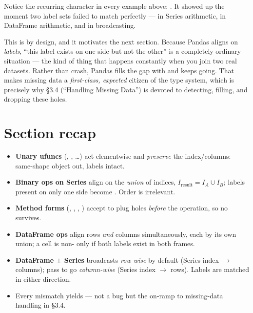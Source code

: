 \documentclass[11pt]{article}
\begin{document}
Notice the recurring character in every example above: . It showed up the moment two label sets failed to match perfectly --- in Series arithmetic, in DataFrame arithmetic, and in broadcasting.

\begin{keyidea}
This is by design, and it motivates the next section. Because Pandas aligns on \emph{labels}, ``this label exists on one side but not the other'' is a completely ordinary situation --- the kind of thing that happens constantly when you join two real datasets. Rather than crash, Pandas fills the gap with  and keeps going. That makes missing data a \emph{first-class, expected} citizen of the type system, which is precisely why \S3.4 (``Handling Missing Data'') is devoted to detecting, filling, and dropping these holes.
\end{keyidea}

\section*{Section recap}
\begin{itemize}
  \item \textbf{Unary ufuncs} (, , \dots) act elementwise and \emph{preserve} the index/columns: same-shape object out, labels intact.
  \item \textbf{Binary ops on Series} align on the \emph{union} of indices, $I_{\text{result}} = I_A \cup I_B$; labels present on only one side become . Order is irrelevant.
  \item \textbf{Method forms} (, , , ) accept  to plug holes \emph{before} the operation, so no  survives.
  \item \textbf{DataFrame ops} align rows \emph{and} columns simultaneously, each by its own union; a cell is non- only if both labels exist in both frames.
  \item \textbf{DataFrame $\pm$ Series} broadcasts \emph{row-wise} by default (Series index $\to$ columns); pass  to go \emph{column-wise} (Series index $\to$ rows). Labels are matched in either direction.
  \item Every mismatch yields  --- not a bug but the on-ramp to missing-data handling in \S3.4.
\end{itemize}
\end{document}
